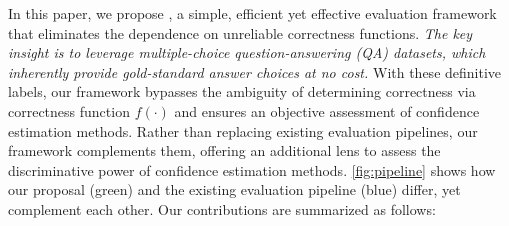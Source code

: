 In this paper, we propose \uqeval, a simple, efficient yet effective evaluation framework that eliminates the dependence on unreliable correctness functions.
\textit{The key insight is to leverage multiple-choice question-answering (QA) datasets, which inherently provide gold-standard answer choices at no cost.} 
With these definitive labels, our framework bypasses the ambiguity of determining correctness via correctness function $f(\cdot)$ and ensures an objective assessment of confidence estimation methods. 
Rather than replacing existing evaluation pipelines, our framework complements them, offering an additional lens to assess the discriminative power of confidence estimation methods.
\cref{fig:pipeline} shows how our proposal (green) and the existing evaluation pipeline (blue) differ, yet complement each other.
Our contributions are summarized as follows:

